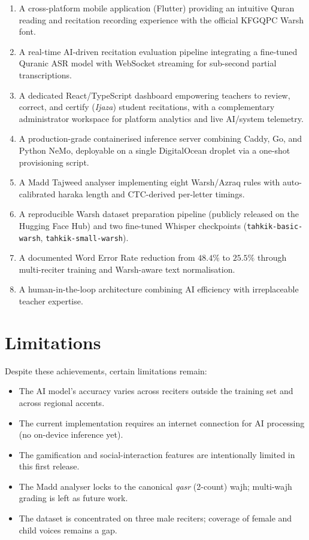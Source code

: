 \begin{emeraldbox}[title=Key Contributions of the Tahkik Project]
\begin{enumerate}
  \item A cross-platform mobile application (Flutter) providing an
        intuitive Quran reading and recitation recording experience with
        the official KFGQPC Warsh font.
  \item A real-time AI-driven recitation evaluation pipeline integrating
        a fine-tuned Quranic ASR model with WebSocket streaming for
        sub-second partial transcriptions.
  \item A dedicated React/TypeScript dashboard empowering teachers to
        review, correct, and certify (\textit{Ijaza}) student
        recitations, with a complementary administrator workspace for
        platform analytics and live AI/system telemetry.
  \item A production-grade containerised inference server combining
        Caddy, Go, and Python NeMo, deployable on a single DigitalOcean
        droplet via a one-shot provisioning script.
  \item A Madd Tajweed analyser implementing eight Warsh/Azraq rules
        with auto-calibrated haraka length and CTC-derived per-letter
        timings.
  \item A reproducible Warsh dataset preparation pipeline (publicly
        released on the Hugging Face Hub) and two fine-tuned Whisper
        checkpoints (\texttt{tahkik-basic-warsh},
        \texttt{tahkik-small-warsh}).
  \item A documented Word Error Rate reduction from $48.4\%$ to $25.5\%$
        through multi-reciter training and Warsh-aware text
        normalisation.
  \item A human-in-the-loop architecture combining AI efficiency with
        irreplaceable teacher expertise.
\end{enumerate}
\end{emeraldbox}

\section*{Limitations}

Despite these achievements, certain limitations remain:
\begin{itemize}
  \item The AI model's accuracy varies across reciters outside the
        training set and across regional accents.
  \item The current implementation requires an internet connection for
        AI processing (no on-device inference yet).
  \item The gamification and social-interaction features are
        intentionally limited in this first release.
  \item The Madd analyser locks to the canonical \emph{qasr} (2-count)
        wajh; multi-wajh grading is left as future work.
  \item The dataset is concentrated on three male reciters; coverage of
        female and child voices remains a gap.
\end{itemize}

